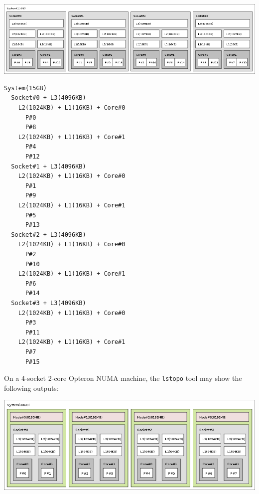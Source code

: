  \begin{ImageNoCaption}\mbox{\includegraphics[width=\textwidth]{dudley.png}}
\end{ImageNoCaption}




\begin{Code}\begin{verbatim}System(15GB)
  Socket#0 + L3(4096KB)
    L2(1024KB) + L1(16KB) + Core#0
      P#0
      P#8
    L2(1024KB) + L1(16KB) + Core#1
      P#4
      P#12
  Socket#1 + L3(4096KB)
    L2(1024KB) + L1(16KB) + Core#0
      P#1
      P#9
    L2(1024KB) + L1(16KB) + Core#1
      P#5
      P#13
  Socket#2 + L3(4096KB)
    L2(1024KB) + L1(16KB) + Core#0
      P#2
      P#10
    L2(1024KB) + L1(16KB) + Core#1
      P#6
      P#14
  Socket#3 + L3(4096KB)
    L2(1024KB) + L1(16KB) + Core#0
      P#3
      P#11
    L2(1024KB) + L1(16KB) + Core#1
      P#7
      P#15
\end{verbatim}
\end{Code}



On a 4-socket 2-core Opteron NUMA machine, the {\tt lstopo} tool may show the following outputs:

 \begin{ImageNoCaption}\mbox{\includegraphics[width=\textwidth]{hagrid.png}}
\end{ImageNoCaption}




